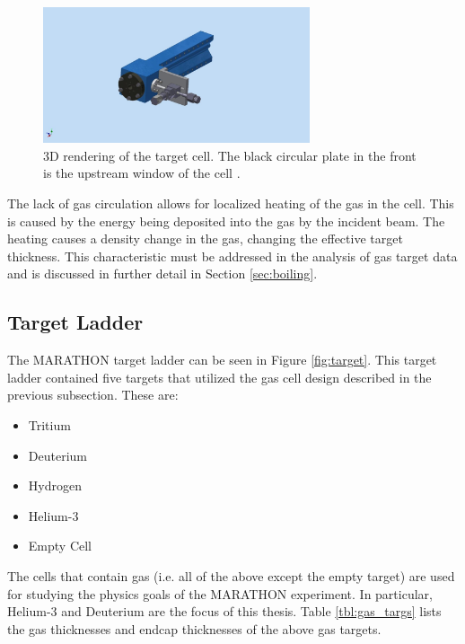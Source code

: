 \begin{figure}[h]
\begin{center}
	\includegraphics[width=0.7\textwidth]{./setup/fig/targ_cell.png}
	\caption{3D rendering of the target cell. The black circular plate in the front is the upstream window of the cell \cite{cell_design}.}
	\label{fig:3d_cell}
\end{center}
\end{figure}

The lack of gas circulation allows for localized heating of the gas in the cell. This is caused by the energy being deposited into the gas by the incident beam. The heating causes a density change in the gas, changing the effective target thickness. This characteristic must be addressed in the analysis of gas target data and is discussed in further detail in Section \ref{sec:boiling}.

\subsection{Target Ladder}
The MARATHON target ladder can be seen in Figure \ref{fig:target}. This target ladder contained five targets that utilized the gas cell design described in the previous subsection. These are:
\begin{itemize}
	\item Tritium
	\item Deuterium
	\item Hydrogen
	\item Helium-3
	\item Empty Cell
\end{itemize}

The cells that contain gas (i.e. all of the above except the empty target) are used for studying the physics goals of the MARATHON experiment. In particular, Helium-3 and Deuterium are the focus of this thesis. Table \ref{tbl:gas_targs} lists the gas thicknesses and endcap thicknesses of the above gas targets.

